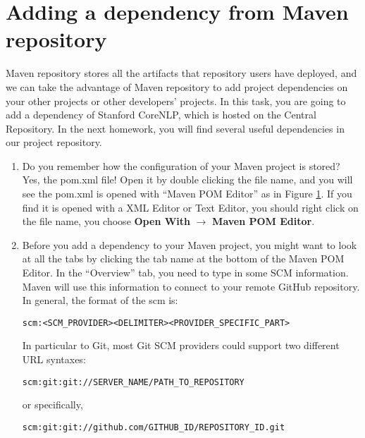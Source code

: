 \section{Adding a dependency from Maven repository}

Maven repository stores all the artifacts that repository users have deployed,
and we can take the advantage of Maven repository to add project dependencies on
your other projects or other developers' projects. In this task, you are going
to add a dependency of Stanford CoreNLP, which is hosted on the Central
Repository. In the next homework, you will find several useful dependencies in
our project repository.

\begin{enumerate}
 
\begin{figure}[t]
\centering
\texttt{[image: repo-01-pom]}
\caption{Opening a POM file\label{repo-01-pom}}
\end{figure}

\item Do you remember how the configuration of your Maven project is stored?
Yes, the pom.xml file! Open it by double clicking the file name, and you will
see the pom.xml is opened with ``Maven POM Editor'' as in Figure
\ref{repo-01-pom}. If you find it is opened with a XML Editor or Text Editor,
you should right click on the file name, you choose \textbf{Open With}
$\rightarrow$ \textbf{Maven POM Editor}.

\item Before you add a dependency to your Maven project, you might want to look
at all the tabs by clicking the tab name at the bottom of the Maven POM Editor.
In the ``Overview'' tab, you need to type in some SCM information. Maven will
use this information to connect to your remote GitHub repository. In general,
the format of the scm is:

\begin{verbatim}
scm:<SCM_PROVIDER><DELIMITER><PROVIDER_SPECIFIC_PART>
\end{verbatim}

In particular to Git, most Git SCM providers could support two different URL
syntaxes:

\begin{verbatim}
scm:git:git://SERVER_NAME/PATH_TO_REPOSITORY
\end{verbatim}

or specifically, 

\begin{verbatim}
scm:git:git://github.com/GITHUB_ID/REPOSITORY_ID.git
\end{verbatim}


\end{enumerate}
